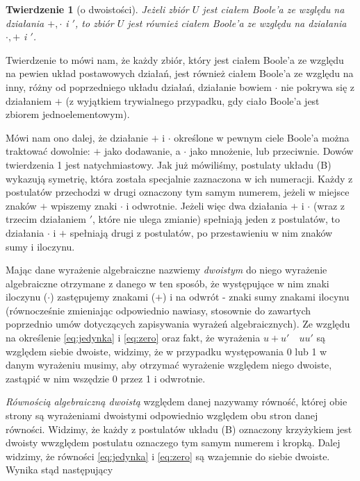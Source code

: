 \documentclass[12 pt, a4paper, leqno]{book}
\numberwithin{equation}{section}
\theoremstyle{twr}
\newtheorem{twr}{Twierdzenie}
\theoremstyle{twr}
\theoremstyle{eqtext}
\theoremstyle{okreslenie}
\begin{document}
\begin{twr}[o dwoistości]
Jeżeli zbiór $U$ jest ciałem Boole'a ze względu na działania $+, \cdot$ i $'$, to zbiór $U$ jest również ciałem Boole'a
ze względu na działania $\cdot, +$ i $'$.
\end{twr}

Twierdzenie to mówi nam, że każdy zbiór, który jest ciałem Boole'a ze względu na pewien układ postawowych działań, jest również ciałem Boole'a
ze względu na inny, różny od poprzedniego układu działań, działanie bowiem $\cdot$ nie pokrywa się z działaniem $+$ (z wyjątkiem trywialnego
przypadku, gdy ciało Boole'a jest zbiorem jednoelementowym).

Mówi nam ono dalej, że działanie $+$ i $\cdot$ określone w pewnym ciele Boole'a można traktować dowolnie: $+$ jako dodawanie, a $\cdot$ jako 
mnożenie, lub przeciwnie. Dowów twierdzenia 1 jest natychmiastowy. Jak już mówiliśmy, postulaty układu (B) wykazują symetrię, która została 
specjalnie zaznaczona w ich numeracji. Każdy z postulatów przechodzi w drugi oznaczony tym samym numerem, jeżeli w miejsce znaków
$+$ wpiszemy znaki $\cdot$ i odwrotnie. Jeżeli więc dwa działania $+$ i $\cdot$ (wraz z trzecim działaniem $'$, które nie ulega zmianie)
spełniają jeden z postulatów, to działania $\cdot$ i $+$ spełniają drugi z postulatów, po przestawieniu w nim znaków sumy i iloczynu.

Mając dane wyrażenie algebraiczne nazwiemy \textit{dwoistym} do niego wyrażenie algebraiczne otrzymane z danego w ten sposób, że występujące
w nim znaki iloczynu ($\cdot$) zastępujemy znakami ($+$) i na odwrót - znaki sumy znakami ilocynu (równocześnie zmieniając odpowiednio nawiasy, stosownie
do zawartych poprzednio umów dotyczących zapisywania wyrażeń algebraicznych). Ze względu na określenie \eqref{eq:jedynka} i \eqref{eq:zero} oraz fakt,
że wyrażenia $u + u' \quad uu'$ są względem siebie dwoiste, widzimy, że w przypadku występowania 0 lub 1 w danym wyrażeniu musimy, aby otrzymać wyrażenie względem
niego dwoiste, zastąpić w nim wszędzie 0 przez 1 i odwrotnie.

\textit{Równością algebraiczną dwoistą} względem danej nazywamy równość, której obie strony są wyrażeniami dwoistymi odpowiednio względem obu stron danej równości.
Widzimy, że każdy z postulatów układu (B) oznaczony krzyżykiem jest dwoisty wwzględem postulatu oznaczego tym samym numerem i kropką. Dalej widzimy,
że równości \eqref{eq:jedynka} i \eqref{eq:zero} są wzajemnie do siebie dwoiste. Wynika stąd następujący 
\end{document}
